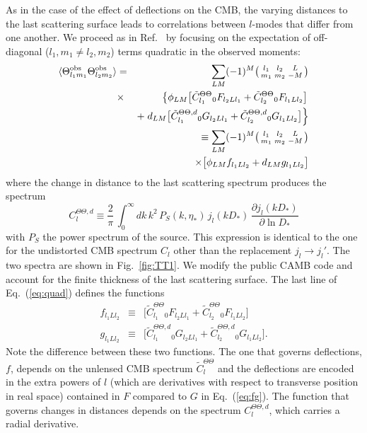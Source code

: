 \documentclass[prl,amsmath,amssymb,floatfix,superscriptaddress,nofootinbib,twocolumn]{revtex4-1}
\def\be{\begin{equation}}
\def\ee{\end{equation}}
\def\bea{\begin{eqnarray}}
\def\eea{\end{eqnarray}}
\newcommand{\vs}{\nonumber\\}
\newcommand{\ec}[1]{Eq.~(\ref{eq:#1})}
\newcommand{\eql}[1]{\label{eq:#1}}
\newcommand{\rf}[1]{\ref{fig:#1}}
\begin{document}
As in the case of the effect of deflections on the CMB, the varying distances to the last scattering surface leads to correlations between $l$-modes that differ from one another. We proceed as in Ref.~\cite{Hu:2001tn} by focusing on the expectation of off-diagonal (${l_1,m_1\ne l_2,m_2}$) terms quadratic in the observed moments:
\bea
\langle \tob_{l_1m_1} \tob_{l_2m_2} \rangle &=& \sum_{LM}  (-1)^M \bigl(\begin{smallmatrix} l_1 & l_2 & L \\ m_1 & m_2 & -M  \end{smallmatrix}\bigr) \nonumber \\
&\times&\left\{  \phi_{LM} \big[ \tilde{C}_{l_{1}}^{\Theta\Theta} {}_{0}F_{l_{2}Ll_{1}} +\tilde{C}_{l_{2}}^{\Theta\Theta} {}_{0}F_{l_{1}Ll_{2}}\big] \right. \nonumber \\
&&+ \left. d_{LM} \big[ \tilde{C}_{l_{1}}^{\Theta\Theta,d} {}_{0}G_{l_{2}Ll_{1}} +\tilde{C}_{l_{2}}^{\Theta \Theta,d} {}_{0}G_{l_{1}Ll_{2}}\big] \right \} \nonumber \\
&&\equiv \sum_{LM}(-1)^{M}\bigl(\begin{smallmatrix} l_1 & l_2 & L \\ m_1 & m_2 & -M  \end{smallmatrix}\bigr)
\vs&&\times\big[ \phi_{LM}f_{l_{1}Ll_{2}} + d_{LM}g_{l_{1}Ll_{2}} \big]   \eql{quad}
\eea
where the change in distance to the last scattering spectrum produces the spectrum
\be
C^{\Theta\Theta,d}_{l} \equiv \frac{2}{\pi}\,\int_0^\infty dk\,k^2\, P_S(k,\eta_*)\,j_l(kD_*)\,\frac{\partial j_l(kD_*)}{\partial\ln D_*}\eql{cld}
\ee
with $P_S$ the power spectrum of the source. This expression is identical to the one for the undistorted CMB spectrum $C_l$ other than the replacement $j_l\rightarrow j_l'$. The two spectra are shown in Fig.~\rf{TT1}. We modify the public CAMB code and account for the finite thickness of the last scattering surface. The last line of \ec{quad} defines the functions 
\bea
f_{l_1Ll_2} &\equiv& \big[ \tilde{C}_{l_{1}}^{\Theta\Theta} {}_{0}F_{l_{2}Ll_{1}} +\tilde{C}_{l_{2}}^{\Theta\Theta} {}_{0}F_{l_{1}Ll_{2}}\big]
\vs
g_{l_1Ll_2} &\equiv&\big[ \tilde{C}_{l_{1}}^{\Theta\Theta,d} {}_{0}G_{l_{2}Ll_{1}} +\tilde{C}_{l_{2}}^{\Theta \Theta,d} {}_{0}G_{l_{1}Ll_{2}}\big].\eql{lfg}
\eea
Note the difference between these two functions. The one that governs deflections, $f$, depends on the unlensed CMB spectrum $\tilde{C}_{l}^{\Theta\Theta} $
and the deflections are encoded in the extra powers of $l$ (which are derivatives with respect to transverse position in real space) contained in $F$ compared to $G$ in \ec{fg}. The function that governs changes in distances depends on the spectrum $C^{\Theta\Theta,d}_{l}$, which carries a radial derivative.
\end{document}
